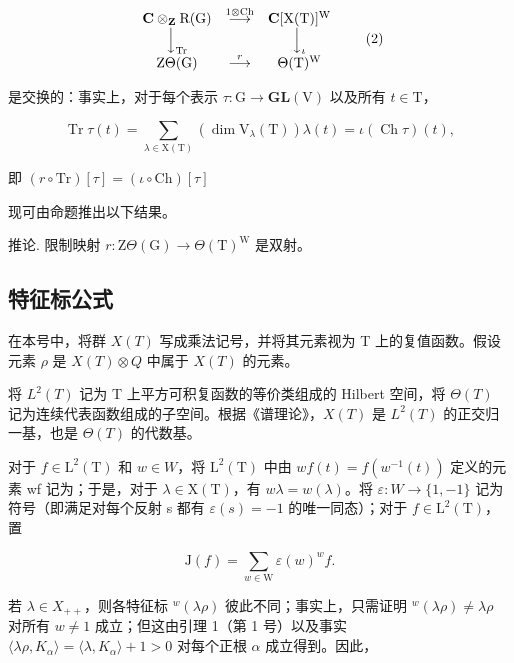 \[
\begin{array}{c c c} \mathbf {C} \otimes_ {\mathbf {Z}} \mathrm{R(G)} & \stackrel {{1 \otimes \mathrm{Ch}}} {{\longrightarrow}} & \mathbf {C} [ \mathrm{X(T)} ] ^ {\mathrm{W}} \\ \Big \downarrow_ {\mathrm{Tr}} & & \Big \downarrow_ {\iota} \\ \mathrm{Z} \Theta (\mathrm{G}) & \stackrel {{r}} {{\longrightarrow}} & \Theta (\mathrm{T}) ^ {\mathrm{W}} \end{array}\tag{2}
\]

是交换的：事实上，对于每个表示 \(\tau : \mathrm{G} \to \mathbf{GL}(\mathrm{V})\) 以及所有 \(t \in \mathrm{T}\)，

\[
\operatorname{Tr} \tau (t) = \sum_ {\lambda \in \mathrm{X} (\mathrm{T})} \left(\dim \mathrm{V} _ {\lambda} (\mathrm{T})\right) \lambda (t) = \iota (\operatorname{Ch} \tau) (t),
\]

即 \((r\circ \mathrm{Tr})[\tau ] = (\iota \circ \mathrm{Ch})[\tau ]\)

现可由命题推出以下结果。

推论. 限制映射 \(r: \mathrm{Z}\Theta(\mathrm{G}) \to \Theta(\mathrm{T})^{\mathrm{W}}\) 是双射。

\subsection{特征标公式}

在本号中，将群 \(X(T)\) 写成乘法记号，并将其元素视为 T 上的复值函数。假设元素 \(\rho\) 是 \(X(T) \otimes Q\) 中属于 \(X(T)\) 的元素。

将 \(L^{2}(T)\) 记为 T 上平方可积复函数的等价类组成的 Hilbert 空间，将 \(\Theta(T)\) 记为连续代表函数组成的子空间。根据《谱理论》，\(X(T)\) 是 \(L^{2}(T)\) 的正交归一基，也是 \(\Theta(T)\) 的代数基。

对于 \(f \in \mathrm{L}^{2}(\mathrm{T})\) 和 \(w \in W\)，将 \(\mathrm{L}^{2}(\mathrm{T})\) 中由 \(wf(t) = f(w^{-1}(t))\) 定义的元素 wf 记为；于是，对于 \(\lambda \in \mathrm{X}(\mathrm{T})\)，有 \(w\lambda = w(\lambda)\)。将 \(\varepsilon : W \to \{1, -1\}\) 记为符号（即满足对每个反射 s 都有 \(\varepsilon(s) = -1\) 的唯一同态）；对于 \(f \in \mathrm{L}^{2}(\mathrm{T})\)，置

\[
\mathrm{J} (f) = \sum_ {w \in \mathrm{W}} \varepsilon (w) ^ {w} f.
\]

若 \(\lambda \in X_{++}\)，则各特征标 \(^w (\lambda \rho)\) 彼此不同；事实上，只需证明 \(^w (\lambda \rho)\neq \lambda \rho\) 对所有 \(w\neq 1\) 成立；但这由引理 1（第 1 号）以及事实 \(\langle \lambda \rho ,K_{\alpha}\rangle = \langle \lambda ,K_{\alpha}\rangle +1 > 0\) 对每个正根 \(\alpha\) 成立得到。因此，

